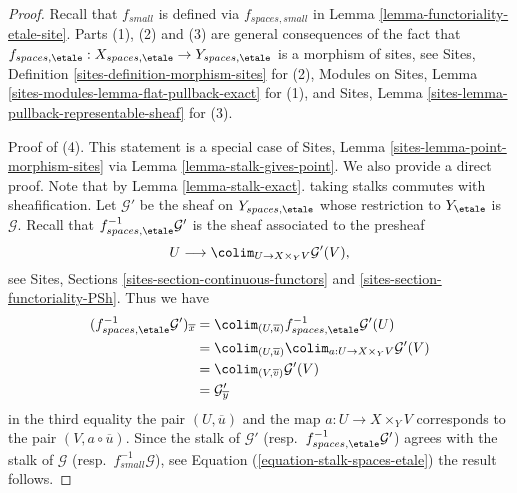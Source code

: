 \begin{proof}
Recall that $f_{small}$ is defined via $f_{spaces, small}$ in
Lemma \ref{lemma-functoriality-etale-site}.
Parts (1), (2) and (3) are general consequences of the fact that
$f_{spaces, \etale} :
X_{spaces, \etale}
\to
Y_{spaces, \etale}$
is a morphism of sites, see
Sites, Definition \ref{sites-definition-morphism-sites}
for (2),
Modules on Sites, Lemma \ref{sites-modules-lemma-flat-pullback-exact}
for (1), and
Sites, Lemma \ref{sites-lemma-pullback-representable-sheaf}
for (3).

\medskip\noindent
Proof of (4). This statement is a special case of
Sites, Lemma \ref{sites-lemma-point-morphism-sites}
via
Lemma \ref{lemma-stalk-gives-point}.
We also provide a direct proof. Note that by
Lemma \ref{lemma-stalk-exact}.
taking stalks commutes with sheafification.
Let $\mathcal{G}'$ be the sheaf on $Y_{spaces, \etale}$ whose restriction
to $Y_\etale$ is $\mathcal{G}$.
Recall that $f_{spaces, \etale}^{-1}\mathcal{G}'$ is the sheaf
associated to the presheaf
$$
U \longrightarrow \colim_{U \to X \times_Y V} \mathcal{G}'(V),
$$
see
Sites, Sections \ref{sites-section-continuous-functors} and
\ref{sites-section-functoriality-PSh}.
Thus we have
\begin{align*}
(f_{spaces, \etale}^{-1}\mathcal{G}')_{\overline{x}}
& =
\colim_{(U, \overline{u})} f_{spaces, \etale}^{-1}\mathcal{G}'(U)
\\
& = \colim_{(U, \overline{u})}
\colim_{a : U \to X \times_Y V} \mathcal{G}'(V) \\
& = \colim_{(V, \overline{v})} \mathcal{G}'(V) \\
& = \mathcal{G}'_{\overline{y}}
\end{align*}
in the third equality the pair $(U, \overline{u})$ and the map
$a : U \to X \times_Y V$ corresponds to the pair $(V, a \circ \overline{u})$.
Since the stalk of $\mathcal{G}'$
(resp.\ $f_{spaces, \etale}^{-1}\mathcal{G}'$)
agrees with the stalk of $\mathcal{G}$ (resp.\ $f_{small}^{-1}\mathcal{G}$),
see
Equation (\ref{equation-stalk-spaces-etale})
the result follows.
\end{proof}

